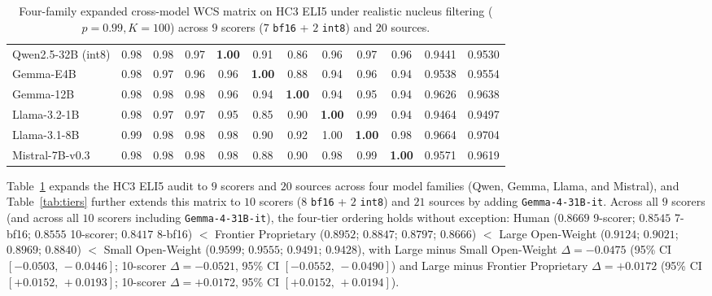 \documentclass[11pt]{article}
\begin{document}
\begin{table}[t]
{\begin{tabular}{lccccccccccc}
Qwen2.5-32B (int8) & 0.98 & 0.98 & 0.97 & \textbf{1.00} & 0.91 & 0.86 & 0.96 & 0.97 & 0.96 & 0.9441 & 0.9530 \\
Gemma-E4B & 0.98 & 0.97 & 0.96 & 0.96 & \textbf{1.00} & 0.88 & 0.94 & 0.96 & 0.94 & 0.9538 & 0.9554 \\
Gemma-12B & 0.98 & 0.98 & 0.98 & 0.96 & 0.94 & \textbf{1.00} & 0.94 & 0.95 & 0.94 & 0.9626 & 0.9638 \\
Llama-3.2-1B & 0.98 & 0.97 & 0.97 & 0.95 & 0.85 & 0.90 & \textbf{1.00} & 0.99 & 0.94 & 0.9464 & 0.9497 \\
Llama-3.1-8B & 0.99 & 0.98 & 0.98 & 0.98 & 0.90 & 0.92 & 1.00 & \textbf{1.00} & 0.98 & 0.9664 & 0.9704 \\
Mistral-7B-v0.3 & 0.98 & 0.98 & 0.98 & 0.98 & 0.88 & 0.90 & 0.98 & 0.99 & \textbf{1.00} & 0.9571 & 0.9619 \\
\bottomrule
\end{tabular}%
}
\caption{Four-family expanded cross-model WCS matrix on HC3 ELI5 under realistic nucleus filtering ($p=0.99, K=100$) across $9$ scorers ($7$ \texttt{bf16} + $2$ \texttt{int8}) and $20$ sources.}
\label{tab:eli5_4family}
\end{table}

Table~\ref{tab:eli5_4family} expands the HC3 ELI5 audit to $9$ scorers and $20$ sources across four model families (Qwen, Gemma, Llama, and Mistral), and Table~\ref{tab:tiers} further extends this matrix to $10$ scorers ($8$ \texttt{bf16} + $2$ \texttt{int8}) and $21$ sources by adding \texttt{Gemma-4-31B-it}. Across all $9$ scorers (and across all $10$ scorers including \texttt{Gemma-4-31B-it}), the four-tier ordering holds without exception: Human ($0.8669$ 9-scorer; $0.8545$ 7-bf16; $0.8555$ 10-scorer; $0.8417$ 8-bf16) $<$ Frontier Proprietary ($0.8952$; $0.8847$; $0.8797$; $0.8666$) $<$ Large Open-Weight ($0.9124$; $0.9021$; $0.8969$; $0.8840$) $<$ Small Open-Weight ($0.9599$; $0.9555$; $0.9491$; $0.9428$), with Large minus Small Open-Weight $\Delta = -0.0475$ (95\% CI $[-0.0503,\,-0.0446]$; 10-scorer $\Delta = -0.0521$, 95\% CI $[-0.0552,\,-0.0490]$) and Large minus Frontier Proprietary $\Delta = +0.0172$ (95\% CI $[+0.0152,\,+0.0193]$; 10-scorer $\Delta = +0.0172$, 95\% CI $[+0.0152,\,+0.0194]$).
\end{document}
